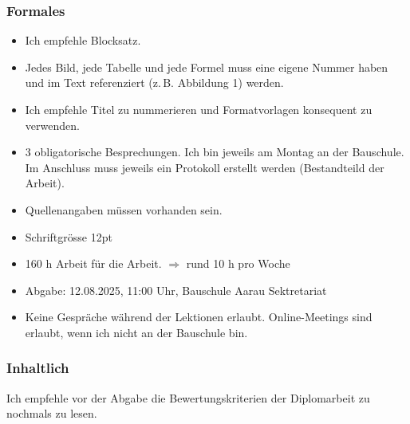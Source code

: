 \documentclass[
11pt,
captions=tableheading,
smallheadings,
headsepline,
footsepline, 
captions=tableheading,
parskip=half-,
]{scrartcl}
\begin{document}
\subsubsection*{Formales}
\begin{itemize}
\item Ich empfehle Blocksatz.
\item Jedes Bild, jede Tabelle und jede Formel muss eine eigene Nummer haben und im Text referenziert (z.\,B. Abbildung 1) werden.
\item Ich empfehle Titel zu nummerieren und Formatvorlagen konsequent zu verwenden.
\item 3 obligatorische Besprechungen. Ich bin jeweils am Montag an der Bauschule. Im Anschluss muss jeweils ein Protokoll erstellt werden (Bestandteild der Arbeit).
\item Quellenangaben müssen vorhanden sein.
\item Schriftgrösse 12pt 
\item 160 h Arbeit für die Arbeit. $\Rightarrow $ rund 10 h pro Woche
\item Abgabe: 12.08.2025, 11:00 Uhr, Bauschule Aarau Sektretariat
\item Keine Gespräche während der Lektionen erlaubt. Online-Meetings sind erlaubt, wenn ich nicht an der Bauschule bin.
\end{itemize}

\subsubsection*{Inhaltlich}
Ich empfehle vor der Abgabe  die Bewertungskriterien der Diplomarbeit zu nochmals zu lesen.
\end{document}
